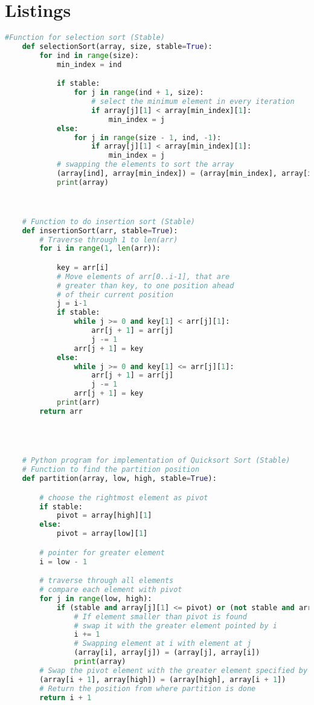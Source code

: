 \documentclass{report}
\begin{document}
\section{Listings}
\begin{lstlisting}[language=python]
	#Function for selection sort (Stable)
	def selectionSort(array, size, stable=True):
		for ind in range(size):
			min_index = ind

			if stable:
				for j in range(ind + 1, size):
					# select the minimum element in every iteration
					if array[j][1] < array[min_index][1]:
						min_index = j
			else:
				for j in range(size - 1, ind, -1):
					if array[j][1] < array[min_index][1]:
						min_index = j
			# swapping the elements to sort the array
			(array[ind], array[min_index]) = (array[min_index], array[ind])
			print(array)



	# Function to do insertion sort (Stable)
	def insertionSort(arr, stable=True):
		# Traverse through 1 to len(arr)
		for i in range(1, len(arr)):

			key = arr[i]
			# Move elements of arr[0..i-1], that are
			# greater than key, to one position ahead
			# of their current position
			j = i-1
			if stable:
				while j >= 0 and key[1] < arr[j][1]:
					arr[j + 1] = arr[j]
					j -= 1
				arr[j + 1] = key
			else:
				while j >= 0 and key[1] <= arr[j][1]:
					arr[j + 1] = arr[j]
					j -= 1
				arr[j + 1] = key
			print(arr)
		return arr




	# Python program for implementation of Quicksort Sort (Stable)
	# Function to find the partition position
	def partition(array, low, high, stable=True):

		# choose the rightmost element as pivot
		if stable:
			pivot = array[high][1]
		else:
			pivot = array[low][1]

		# pointer for greater element
		i = low - 1

		# traverse through all elements
		# compare each element with pivot
		for j in range(low, high):
			if (stable and array[j][1] <= pivot) or (not stable and array[j][1] < pivot):
				# If element smaller than pivot is found
				# swap it with the greater element pointed by i
				i += 1
				# Swapping element at i with element at j
				(array[i], array[j]) = (array[j], array[i])
				print(array)
		# Swap the pivot element with the greater element specified by i
		(array[i + 1], array[high]) = (array[high], array[i + 1])
		# Return the position from where partition is done
		return i + 1



\end{lstlisting}
\end{document}
